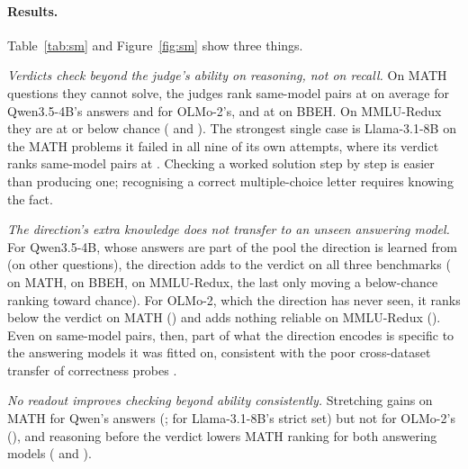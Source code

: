 \documentclass[11pt]{article}
\begin{document}
\begin{table}[t]
\centering
\small

\caption{Same-model pairs on questions the judge cannot solve: verdict ranking (mean over judges, 50 = chance) and pooled gains of each readout over the verdict. Bold: 95\% interval above 0. $^\dagger$Llama-3.1-8B on the  MATH questions it failed in all 9 of its own attempts. Per-judge numbers: Appendix Table~\ref{tab:smpairs}.}
\label{tab:sm}
\end{table}

\paragraph{Results.} Table~\ref{tab:sm} and Figure~\ref{fig:sm} show three things.

\emph{Verdicts check beyond the judge's ability on reasoning, not on recall.} On MATH questions they cannot solve, the judges rank same-model pairs at  on average for Qwen3.5-4B's answers and  for OLMo-2's, and at  on BBEH. On MMLU-Redux they are at or below chance ( and ). The strongest single case is Llama-3.1-8B on the  MATH problems it failed in all nine of its own attempts, where its verdict ranks same-model pairs at . Checking a worked solution step by step is easier than producing one; recognising a correct multiple-choice letter requires knowing the fact.

\emph{The direction's extra knowledge does not transfer to an unseen answering model.} For Qwen3.5-4B, whose answers are part of the pool the direction is learned from (on other questions), the direction adds to the verdict on all three benchmarks ( on MATH,  on BBEH,  on MMLU-Redux, the last only moving a below-chance ranking toward chance). For OLMo-2, which the direction has never seen, it ranks below the verdict on MATH () and adds nothing reliable on MMLU-Redux (). Even on same-model pairs, then, part of what the direction encodes is specific to the answering models it was fitted on, consistent with the poor cross-dataset transfer of correctness probes \citep{orgad2025llms,gulati2026auditing}.

\emph{No readout improves checking beyond ability consistently.} Stretching gains on MATH for Qwen's answers (;  for Llama-3.1-8B's strict set) but not for OLMo-2's (), and reasoning before the verdict lowers MATH ranking for both answering models ( and ).
\end{document}
